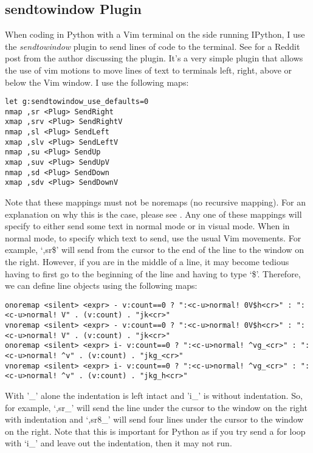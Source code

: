 \documentclass[10pt]{article}
\begin{document}
\subsection{sendtowindow Plugin}
When coding in Python with a Vim terminal on the side running IPython, I use the
\textit{sendtowindow} plugin \cite{KKPMW2016send} to send lines of code to the
terminal. See \cite{KKPMW2019send} for a Reddit post from the author discussing
the plugin. It's a very simple plugin that allows the use of vim motions to move
lines of text to terminals left, right, above or below the Vim window. I use the
following maps:\\
\begin{lstlisting}
let g:sendtowindow_use_defaults=0
nmap ,sr <Plug> SendRight
xmap ,srv <Plug> SendRightV
nmap ,sl <Plug> SendLeft
xmap ,slv <Plug> SendLeftV
nmap ,su <Plug> SendUp
xmap ,suv <Plug> SendUpV
nmap ,sd <Plug> SendDown
xmap ,sdv <Plug> SendDownV
\end{lstlisting}
Note that these mappings must not be noremaps (no recursive mapping). For an
explanation on why this is the case, please see \cite{justrajdeep2018please}.
Any one of these mappings will specify to either send some text in normal mode
or in visual mode. When in normal mode, to specify which text to send, use the
usual Vim movements. For example, `,sr\$' will send from the cursor to the end
of the line to the window on the right. However, if you are in the middle of a
line, it may become tedious having to first go to the beginning of the line and
having to type `\$'. Therefore, we can define line objects using the following
maps:
\begin{lstlisting}
onoremap <silent> <expr> - v:count==0 ? ":<c-u>normal! 0V$h<cr>" : ":<c-u>normal! V" . (v:count) . "jk<cr>"
vnoremap <silent> <expr> - v:count==0 ? ":<c-u>normal! 0V$h<cr>" : ":<c-u>normal! V" . (v:count) . "jk<cr>"
onoremap <silent> <expr> i- v:count==0 ? ":<c-u>normal! ^vg_<cr>" : ":<c-u>normal! ^v" . (v:count) . "jkg_<cr>"
vnoremap <silent> <expr> i- v:count==0 ? ":<c-u>normal! ^vg_<cr>" : ":<c-u>normal! ^v" . (v:count) . "jkg_h<cr>"
\end{lstlisting}
With '\_' alone the indentation is left intact and 'i\_' is without indentation.
So, for example, `,sr\_' will send the line under the cursor to the window on
the right with indentation and `,sr8\_' will send four lines under the cursor to
the window on the right. Note that this is important for Python as if you try
send a for loop with `i\_' and leave out the indentation, then it may not run.\\
\end{document}
